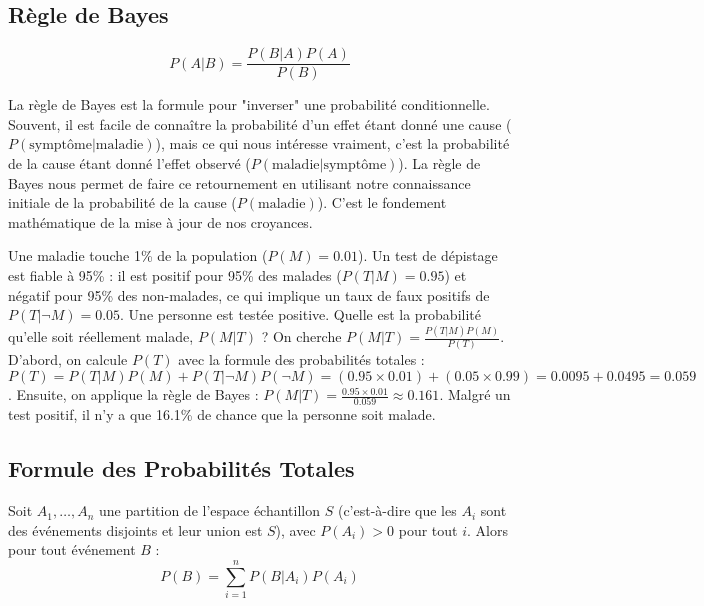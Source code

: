 \subsection{Règle de Bayes}

\begin{theorembox}
$$P(A|B) = \frac{P(B|A)P(A)}{P(B)}$$
\end{theorembox}

\begin{intuitionbox}
La règle de Bayes est la formule pour "inverser" une probabilité conditionnelle. Souvent, il est facile de connaître la probabilité d'un effet étant donné une cause ($P(\text{symptôme}|\text{maladie})$), mais ce qui nous intéresse vraiment, c'est la probabilité de la cause étant donné l'effet observé ($P(\text{maladie}|\text{symptôme})$). La règle de Bayes nous permet de faire ce retournement en utilisant notre connaissance initiale de la probabilité de la cause ($P(\text{maladie})$). C'est le fondement mathématique de la mise à jour de nos croyances.
\end{intuitionbox}

\begin{examplebox}
Une maladie touche 1\% de la population ($P(M) = 0.01$). Un test de dépistage est fiable à 95\% : il est positif pour 95\% des malades ($P(T|M)=0.95$) et négatif pour 95\% des non-malades, ce qui implique un taux de faux positifs de $P(T|\neg M) = 0.05$.
Une personne est testée positive. Quelle est la probabilité qu'elle soit réellement malade, $P(M|T)$ ?
On cherche $P(M|T) = \frac{P(T|M)P(M)}{P(T)}$.
D'abord, on calcule $P(T)$ avec la formule des probabilités totales :
$P(T) = P(T|M)P(M) + P(T|\neg M)P(\neg M) = (0.95 \times 0.01) + (0.05 \times 0.99) = 0.0095 + 0.0495 = 0.059$.
Ensuite, on applique la règle de Bayes : $P(M|T) = \frac{0.95 \times 0.01}{0.059} \approx 0.161$.
Malgré un test positif, il n'y a que 16.1\% de chance que la personne soit malade.
\end{examplebox}

\subsection{Formule des Probabilités Totales}

\begin{theorembox}
Soit $A_1, \dots, A_n$ une partition de l'espace échantillon $S$ (c'est-à-dire que les $A_i$ sont des événements disjoints et leur union est $S$), avec $P(A_i) > 0$ pour tout $i$. Alors pour tout événement $B$ :
$$P(B) = \sum_{i=1}^{n} P(B|A_i)P(A_i)$$
\end{theorembox}

